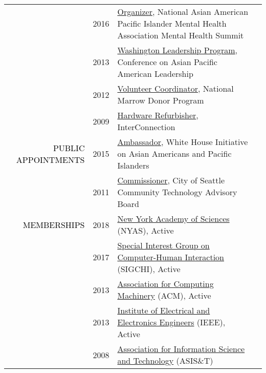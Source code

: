 \documentclass[12pt]{article}
\begin{document}
{{\begin{longtable}{Rp{1.0in}p{0.25in}p{4.75in}}
& \footnotesize{2016} & \href{https://www.facebook.com/events/215634702135825/}{{Organizer}}, National Asian American Pacific Islander Mental Health Association Mental Health Summit \\

& \footnotesize{2013} & \href{http://www.capal.org/programs/wlp/}{{Washington Leadership Program}}, Conference on Asian Pacific American Leadership \\

& \footnotesize{2012} & \href{http://www.dailyuw.com/news/article_de3524ce-3d5e-5dd2-8de7-5deebee463d9.html}{{Volunteer Coordinator}}, National Marrow Donor Program \\

& \footnotesize{2009} & \href{http://www.washington.edu/news/2010/04/22/student-service-and-leadership-to-be-celebrated-april-28/}{{Hardware Refurbisher}}, InterConnection \\

\textcolor{black}{\footnotesize{\uppercase{Public Appointments}}} & \footnotesize{2015} & \href{http://sites.ed.gov/aapi/e3-ambassadors/}{{Ambassador}}, White House Initiative on Asian Americans and Pacific Islanders \\

& \footnotesize{2011} & \href{https://web.archive.org/web/20150911093548/https://ischool.uw.edu/alumni/impact-stories/informatics-grad-and-husky-promise-student-aims-deliver-it-resources}{{Commissioner}}, City of Seattle Community Technology Advisory Board \\

\textcolor{black}{\footnotesize{\uppercase{Memberships}}} & \footnotesize{2018} & \href{https://www.nyas.org/}{{New York Academy of Sciences}} (NYAS), Active \\

 & \footnotesize{2017} & \href{http://www.sigchi.org/}{{Special Interest Group on Computer-Human Interaction}} (SIGCHI), Active \\

& \footnotesize{2013} & \href{https://www.acm.org/}{{Association for Computing Machinery}} (ACM), Active \\

& \footnotesize{2013} & \href{https://www.ieee.org/}{{Institute of Electrical and Electronics Engineers}} (IEEE), Active \\

& \footnotesize{2008} & \href{https://www.asist.org/}{{Association for Information Science and Technology}} (ASIS\&T)
\bigskip \\


\end{longtable}}}
\end{document}
